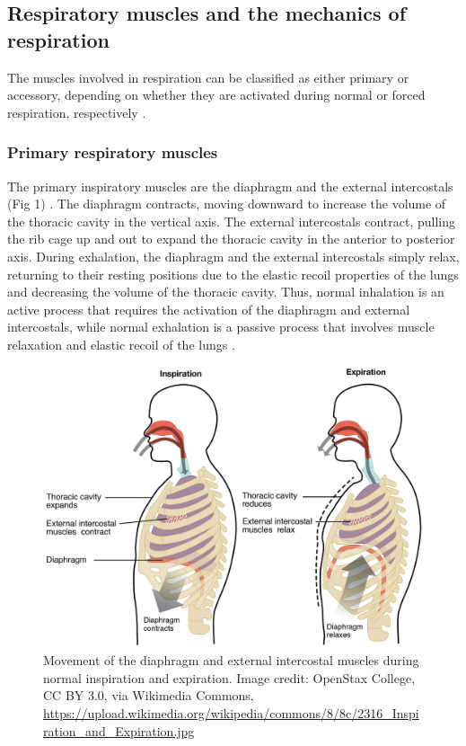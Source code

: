 \documentclass{article}
\begin{document}
\subsection{Respiratory muscles and the mechanics of respiration}

The muscles involved in respiration can be classified as either primary or accessory, depending on whether they are activated during normal or forced respiration, respectively \citep{sieck2013mechanical}.

\subsubsection{Primary respiratory muscles}

The primary inspiratory muscles are the diaphragm and the external intercostals (Fig 1) \citep{sieck2013mechanical, openStax_breathing}. The diaphragm contracts, moving downward to increase the volume of the thoracic cavity in the vertical axis. The external intercostals contract, pulling the rib cage up and out to expand the thoracic cavity in the anterior to posterior axis. During exhalation, the diaphragm and the external intercostals simply relax, returning to their resting positions due to the elastic recoil properties of the lungs and decreasing the volume of the thoracic cavity. Thus, normal inhalation is an active process that requires the activation of the diaphragm and external intercostals, while normal exhalation is a passive process that involves muscle relaxation and elastic recoil of the lungs \citep{sieck2013mechanical, openStax_breathing}.

\begin{figure}[!htbp]
\centering
\includegraphics[width=0.8\linewidth]{files/EPpXta8zJdzN048lz8AR-75707bece0a15f55d1474a61518416bb.jpeg}
\caption[]{Movement of the diaphragm and external intercostal muscles during normal inspiration and expiration. Image credit: OpenStax College, CC BY 3.0, via Wikimedia Commons, \href{https://upload.wikimedia.org/wikipedia/commons/8/8c/2316\_Inspiration\_and\_Expiration.jpg}{https://upload.wikimedia.org/wikipedia/commons/8/8c/2316\_Inspiration\_and\_Expiration.jpg}}
\label{xn9qCYWK2p}
\end{figure}
\end{document}
